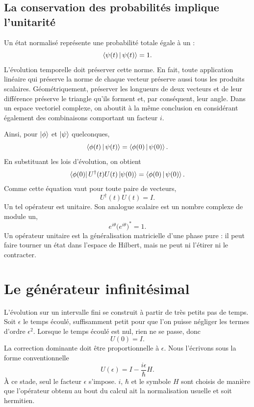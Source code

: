\subsection{La conservation des probabilités implique l’unitarité}

Un état normalisé représente une probabilité totale égale à un :
\begin{equation}
\left\langle\psi(t)\,\middle|\,\psi(t)\right\rangle=1.
\end{equation}
L’évolution temporelle doit préserver cette norme. En fait, toute application linéaire qui préserve la norme de chaque vecteur préserve aussi tous les produits scalaires. Géométriquement, préserver les longueurs de deux vecteurs et de leur différence préserve le triangle qu’ils forment et, par conséquent, leur angle. Dans un espace vectoriel complexe, on aboutit à la même conclusion en considérant également des combinaisons comportant un facteur \(i\).

Ainsi, pour \(\left\lvert\phi\right\rangle\) et \(\left\lvert\psi\right\rangle\) quelconques,
\begin{equation}
\left\langle\phi(t)\,\middle|\,\psi(t)\right\rangle
=
\left\langle\phi(0)\,\middle|\,\psi(0)\right\rangle.
\end{equation}
En substituant les lois d’évolution, on obtient
\begin{equation}
\left\langle\phi(0)\right\rvert U^\dagger(t)U(t)\left\lvert\psi(0)\right\rangle
=
\left\langle\phi(0)\,\middle|\,\psi(0)\right\rangle.
\end{equation}
Comme cette équation vaut pour toute paire de vecteurs,
\begin{equation}
\boxed{U^\dagger(t)U(t)=I}.
\end{equation}
Un tel opérateur est unitaire. Son analogue scalaire est un nombre complexe de module un,
\begin{equation}
e^{i\theta}\bigl(e^{i\theta}\bigr)^*=1.
\end{equation}
Un opérateur unitaire est la généralisation matricielle d’une phase pure : il peut faire tourner un état dans l’espace de Hilbert, mais ne peut ni l’étirer ni le contracter.

\section{Le générateur infinitésimal}

L’évolution sur un intervalle fini se construit à partir de très petits pas de temps. Soit \(\epsilon\) le temps écoulé, suffisamment petit pour que l’on puisse négliger les termes d’ordre \(\epsilon^2\). Lorsque le temps écoulé est nul, rien ne se passe, donc
\begin{equation}
U(0)=I.
\end{equation}
La correction dominante doit être proportionnelle à \(\epsilon\). Nous l’écrivons sous la forme conventionnelle
\begin{equation}
\boxed{U(\epsilon)=I-\frac{i\epsilon}{\hbar}H}.
\end{equation}
À ce stade, seul le facteur \(\epsilon\) s’impose. \(i\), \(\hbar\) et le symbole \(H\) sont choisis de manière que l’opérateur obtenu au bout du calcul ait la normalisation usuelle et soit hermitien.

